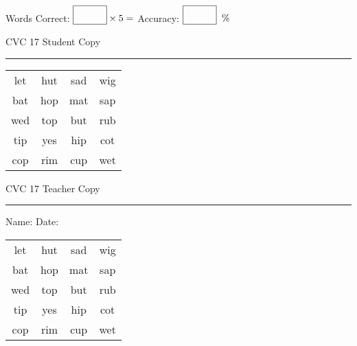 \documentclass{memoir}
\begin{document}
\small

Words Correct: $\fbox{\phantom{\huge 100}} \times 5 = $ Accuracy: $\fbox{\phantom{\huge 100}}\;\; \%$ 

\vfill

\newpage


\footnotesize \noindent
CVC 17 \hfill Student Copy
\smallskip
\hrule

\Large

\setlength{\tabcolsep}{14pt}
\def\arraystretch{2}

{\selectfont


\begin{vplace}[0.5]
\begin{center}
\begin{tabular}{cccc}
let & hut & sad & wig \\
bat & hop & mat & sap \\
wed & top & but & rub \\
tip & yes & hip & cot \\
cop & rim & cup & wet \\
\end{tabular}
\end{center}
\end{vplace}

}

\newpage

\footnotesize \noindent
CVC 17 \hfill Teacher Copy
\smallskip
\hrule

\small

\vfill

\noindent
Name: \underline{\hspace{1.75in}} \hfill Date: \underline{\hspace{1in}}

\Large

{\selectfont


\begin{vplace}[0.5]
\begin{center}
\begin{tabular}{cccc}
let & hut & sad & wig \\
bat & hop & mat & sap \\
wed & top & but & rub \\
tip & yes & hip & cot \\
cop & rim & cup & wet \\
\end{tabular}
\end{center}
\end{vplace}



}
\end{document}
